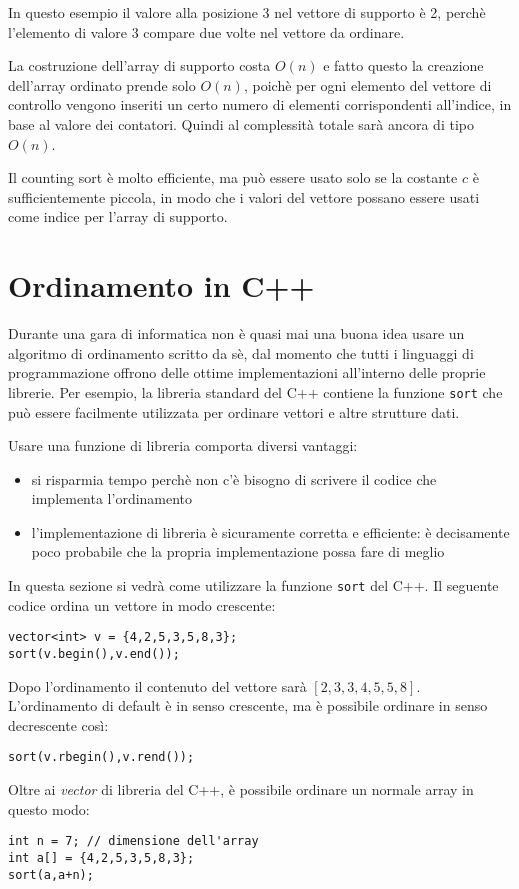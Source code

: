 In questo esempio il valore alla posizione 3
nel vettore di supporto è 2,
perchè l'elemento di valore 3 compare due volte
nel vettore da ordinare.

La costruzione dell'array di supporto costa
$O(n)$ e fatto questo la creazione dell'array ordinato
prende solo $O(n)$, poichè per ogni elemento del vettore
di controllo vengono inseriti un certo numero di elementi 
corrispondenti all'indice, in base al valore dei contatori.
Quindi al complessità totale sarà ancora di tipo $O(n)$.

Il counting sort è molto efficiente, ma può essere usato
solo se la costante $c$ è sufficientemente piccola, in modo 
che i valori del vettore possano essere usati come indice
per l'array di supporto.

\section{Ordinamento in C++}


Durante una gara di informatica 
non è quasi mai una buona idea usare un 
algoritmo di ordinamento scritto da sè,
dal momento che tutti i linguaggi di programmazione
offrono delle ottime implementazioni
all'interno delle proprie librerie.
Per esempio, la libreria standard del C++
contiene la funzione \texttt{sort}
che può essere facilmente utilizzata
per ordinare vettori e altre strutture dati.

Usare una funzione di libreria comporta diversi vantaggi:
\begin{itemize}
\item si risparmia tempo perchè non c'è bisogno di scrivere
il codice che implementa l'ordinamento
\item l'implementazione di libreria è sicuramente
corretta e efficiente: è decisamente poco probabile
che la propria implementazione possa fare di meglio
\end{itemize}

In questa sezione si vedrà come utilizzare la
funzione \texttt{sort} del C++.
Il seguente codice ordina un vettore
in modo crescente:
\begin{lstlisting}
vector<int> v = {4,2,5,3,5,8,3};
sort(v.begin(),v.end());
\end{lstlisting}
Dopo l'ordinamento il contenuto del vettore sarà
$[2,3,3,4,5,5,8]$.
L'ordinamento di default è in senso crescente,
ma è possibile ordinare in senso decrescente così:
\begin{lstlisting}
sort(v.rbegin(),v.rend());
\end{lstlisting}
Oltre ai \emph{vector} di libreria del C++,
è possibile ordinare un normale array in questo modo:
\begin{lstlisting}
int n = 7; // dimensione dell'array
int a[] = {4,2,5,3,5,8,3};
sort(a,a+n);
\end{lstlisting}

